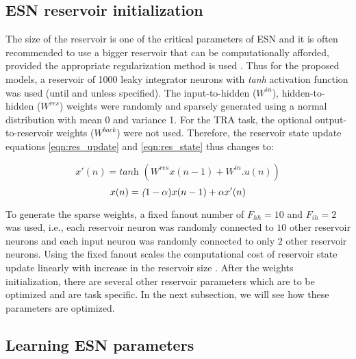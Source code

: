 \subsection{ESN reservoir initialization}

The size of the reservoir is one of the critical parameters of ESN and it is often recommended to use a bigger reservoir that can be computationally afforded, provided the appropriate regularization method is used \cite{esn:practical_guide}. Thus for the proposed models, a reservoir of 1000 leaky integrator neurons with \textit{tanh} activation function was used (until and unless specified). The input-to-hidden ($W^{in}$), hidden-to-hidden ($W^{res}$) weights were randomly and sparsely generated using a normal distribution with mean 0 and variance 1. For the TRA task, the optional output-to-reservoir weights ($W^{back}$) were not used. Therefore, the reservoir state update equations \ref{eqn:res_update} and \ref{eqn:res_state} thus changes to:

\begin{equation} \label{eqn:res_new_update}
x'(n) =\textit {tanh } ( W^{res}x(n-1) + W^{in}.u(n))
\end{equation}
\begin{equation} \label{eqn:res_new_state}
x(n) =\textit (1-\alpha) x(n-1) + \alpha x'(n)
\end{equation}

To generate the sparse weights, a fixed fanout number of $F_{hh} = 10$ and $F_{ih} = 2$ was used, i.e., each reservoir neuron was randomly connected to $10$ other reservoir neurons and each input neuron was randomly connected to only $2$ other reservoir neurons. Using the fixed fanout scales the computational cost of reservoir state update linearly with increase in the reservoir size \cite{esn:practical_guide}. After the weights initialization, there are several other reservoir parameters which are to be optimized and are task specific. In the next subsection, we will see how these parameters are optimized.

\subsection{Learning ESN parameters} \label{grid_search}

